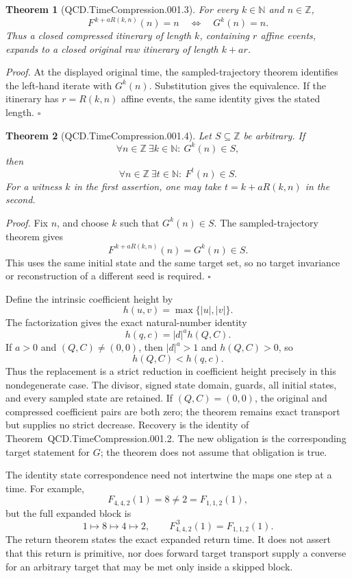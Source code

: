 \documentclass[11pt,letterpaper]{article}
\newcommand{\N}{\mathbb{N}}
\newcommand{\Z}{\mathbb{Z}}
\newtheorem{theorem}{Theorem}
\newenvironment{proof}{\noindent\textit{Proof.}}{\hfill\(\square\)}
\begin{document}
\begin{theorem}[QCD.TimeCompression.001.3]
For every \(k\in\N\) and \(n\in\Z\),
\[
F^{\,k+aR(k,n)}(n)=n
\quad\Longleftrightarrow\quad
G^k(n)=n.
\]
Thus a closed compressed itinerary of length \(k\), containing \(r\) affine
events, expands to a closed original raw itinerary of length \(k+ar\).
\end{theorem}
\begin{proof}
At the displayed original time, the sampled-trajectory theorem identifies the
left-hand iterate with \(G^k(n)\). Substitution gives the equivalence. If the
itinerary has \(r=R(k,n)\) affine events, the same identity gives the stated
length.
\end{proof}

\begin{theorem}[QCD.TimeCompression.001.4]
Let \(S\subseteq\Z\) be arbitrary. If
\[
\forall n\in\Z\ \exists k\in\N:\ G^k(n)\in S,
\]
then
\[
\forall n\in\Z\ \exists t\in\N:\ F^t(n)\in S.
\]
For a witness \(k\) in the first assertion, one may take
\(t=k+aR(k,n)\) in the second.
\end{theorem}
\begin{proof}
Fix \(n\), and choose \(k\) such that \(G^k(n)\in S\). The sampled-trajectory
theorem gives
\[
F^{\,k+aR(k,n)}(n)=G^k(n)\in S.
\]
This uses the same initial state and the same target set, so no target invariance
or reconstruction of a different seed is required.
\end{proof}

Define the intrinsic coefficient height by
\[
h(u,v)=\max\{|u|,|v|\}.
\]
The factorization gives the exact natural-number identity
\[
h(q,c)=|d|^a h(Q,C).
\]
If \(a>0\) and \((Q,C)\ne(0,0)\), then \(|d|^a>1\) and \(h(Q,C)>0\), so
\[
h(Q,C)<h(q,c).
\]
Thus the replacement is a strict reduction in coefficient height precisely in
this nondegenerate case. The divisor, signed state domain, guards, all initial
states, and every sampled state are retained. If \((Q,C)=(0,0)\), the original
and compressed coefficient pairs are both zero; the theorem remains exact
transport but supplies no strict decrease. Recovery is the identity of
Theorem~QCD.TimeCompression.001.2. The new obligation is the corresponding target
statement for \(G\); the theorem does not assume that obligation is true.

The identity state correspondence need not intertwine the maps one step at a
time. For example,
\[
F_{4,4,2}(1)=8\ne2=F_{1,1,2}(1),
\]
but the full expanded block is
\[
1\longmapsto8\longmapsto4\longmapsto2,
\qquad
F_{4,4,2}^{\,3}(1)=F_{1,1,2}(1).
\]
The return theorem states the exact expanded return time. It does not assert that
this return is primitive, nor does forward target transport supply a converse for
an arbitrary target that may be met only inside a skipped block.
\end{document}
